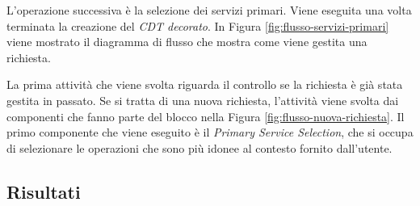 L'operazione successiva è la selezione dei servizi primari. Viene eseguita una volta terminata la creazione del \emph{CDT decorato}. In Figura \ref{fig:flusso-servizi-primari} viene mostrato il diagramma di flusso che mostra come viene gestita una richiesta.

La prima attività che viene svolta riguarda il controllo se la richiesta è già stata gestita in passato. Se si tratta di una nuova richiesta, l'attività viene svolta dai componenti che fanno parte del blocco  nella Figura \ref{fig:flusso-nuova-richiesta}. Il primo componente che viene eseguito è il \emph{Primary Service Selection}, che si occupa di selezionare le operazioni che sono più idonee al contesto fornito dall'utente.

\subsection*{Risultati}

